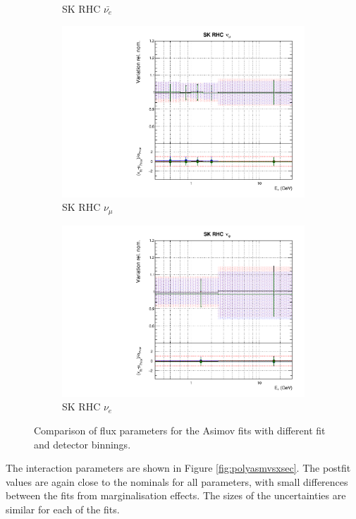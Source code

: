 \begin{figure}
\begin{subfigure}{0.24\textwidth}
  \caption{SK RHC $\bar{\nu_e}$}
\end{subfigure}
\begin{subfigure}{0.24\textwidth}
  \centering
  \includegraphics[width=0.95\linewidth]{figs/polyasmvsflux_14}
  \caption{SK RHC $\nu_{\mu}$}
\end{subfigure}
\begin{subfigure}{0.24\textwidth}
  \centering
  \includegraphics[width=0.95\linewidth]{figs/polyasmvsflux_15}
  \caption{SK RHC $\nu_e$}
\end{subfigure}
\caption{Comparison of flux parameters for the Asimov fits with different fit and detector binnings.}
\label{fig:polyasmvsflux}
\end{figure}

The interaction parameters are shown in Figure \ref{fig:polyasmvsxsec}. The postfit values are again close to the nominals for all parameters, with small differences between the fits from marginalisation effects. The sizes of the uncertainties are similar for each of the fits.


